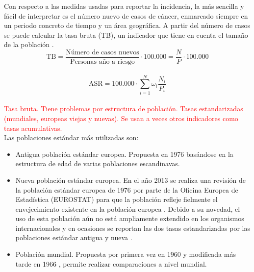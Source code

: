 Con respecto a las medidas usadas para reportar la incidencia, la más sencilla y fácil de interpretar es el número nuevo de casos de cáncer, enmarcado siempre en un periodo concreto de tiempo y un área geográfica. A partir del número de casos se puede calcular la tasa bruta (TB), un indicador que tiene en cuenta el tamaño de la población \cite{IARC1995}.\\

$$\text{TB}  = \dfrac{\text{Número de casos nuevos}}{\text{Personas-año a riesgo}} \cdot 100.000 = \dfrac{N}{P} \cdot 100.000$$\\

$$\text{ASR} = 100.000 \cdot \sum_{i = 1}^{N} \omega_i \dfrac{N_i}{P_i} $$\\

\textcolor{red}{Tasa bruta. Tiene problemas por estructura de población. Tasas estandarizadas (mundiales, europeas viejas y nuevas). Se usan a veces otros indicadores como tasas acumulativas.}\\

Las poblaciones estándar más utilizadas son:
\begin{itemize}
	
	
	\item Antigua población estándar europea. Propuesta en 1976 \cite{Waterhouse1976} basándose en la estructura de edad de varias poblaciones escandinavas.
	
	\item Nueva población estándar europea. En el año 2013 se realiza una revisión de la población estándar europea de 1976 por parte de la Oficina Europea de Estadística (EUROSTAT) para que la población refleje fielmente el envejecimiento existente en la población europea \cite{EUROSTAT2013}. Debido a su novedad, el uso de esta población aún no está ampliamente extendido en los organismos internacionales \cite{ECIS2} y en ocasiones se reportan las dos tasas estandarizadas por las poblaciones estándar antigua y nueva \cite{ECIS}.
	
	\item Población mundial. Propuesta por primera vez en 1960 \cite{SegiM.1960} y modificada más tarde en 1966 \cite{Doll1966}, permite realizar comparaciones a nivel mundial.
\end{itemize}

